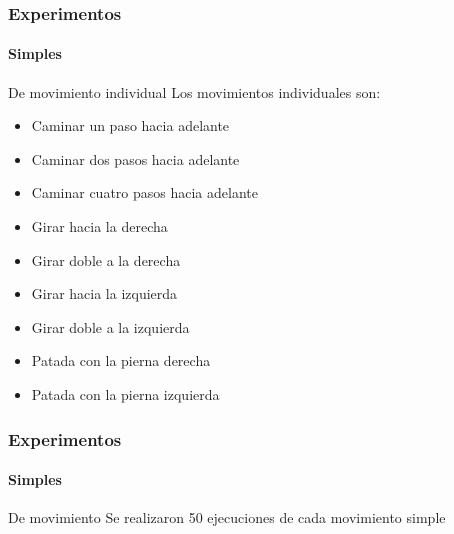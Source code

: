 \documentclass{beamer}
\begin{document}
\begin{frame}
\frametitle{Experimentos}
\framesubtitle{Simples}
\begin{block} {De movimiento individual}
Los movimientos individuales son:
\end{block}

\begin{itemize}
\item Caminar un paso hacia adelante 
\item Caminar dos pasos hacia adelante 
\item Caminar cuatro pasos hacia adelante 
\item Girar hacia la derecha 
\item Girar doble a la derecha 
\item Girar hacia la izquierda 
\item Girar doble a la izquierda
\item Patada con la pierna derecha 
\item Patada con la pierna izquierda

\end{itemize}


\end{frame}

\begin{frame}
\frametitle{Experimentos}
\framesubtitle{Simples}
\begin{block} {De movimiento}
Se realizaron 50 ejecuciones de cada movimiento simple
\end{block}

\begin{figure}[scale = 0.1]
\centering
\label{fig:individuales}
\end{figure}

\end{frame}
\end{document}
